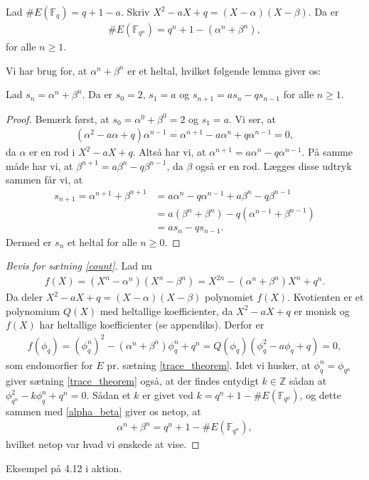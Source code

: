 \begin{theorem}
\label{count}
Lad $\#E(\mathbb{F}_q) = q + 1 - a$. Skriv $X^2 - aX + q= (X-\alpha)(X-\beta)$. Da er
\begin{align*}
	\#E(\mathbb{F}_{q^n}) = q^n + 1 - (\alpha^n + \beta^n),
\end{align*}
for alle $n \geq 1$.
\end{theorem}

Vi har brug for, at $\alpha^n + \beta^n$ er et heltal, hvilket følgende lemma giver os:

\begin{lemma}
Lad $s_n = \alpha^n + \beta^n$. Da er $s_0=2$, $s_1=a$ og $s_{n+1}=as_n - qs_{n-1}$ for alle $n \geq 1$.
\end{lemma}
\begin{proof}
Bemærk først, at $s_0 = \alpha^0 + \beta^0 = 2$ og $s_1 = a$.
Vi ser, at 
\begin{align*}
	(\alpha^2 - a\alpha + q) \alpha^{n-1} = \alpha^{n+1} - a \alpha^n + q\alpha^{n-1} = 0,
\end{align*}
da $\alpha$ er en rod i $X^2 - aX + q$. Altså har vi, at $\alpha^{n+1}=a \alpha^n - q\alpha^{n-1}$. På samme måde har vi, at $\beta^{n+1}=a \beta^n - q \beta^{n-1}$, da $\beta$ også er en rod. Lægges disse udtryk sammen får vi, at
\begin{align*}
	s_{n+1} = \alpha^{n+1} + \beta^{n+1} &= a \alpha^n - q \alpha^{n-1} + a \beta^n - q \beta^{n-1} \\
	&= a (\beta^n + \beta^n) - q (\alpha^{n-1} + \beta^{n-1}) \\
	&= a s_n - q s_{n-1}.
\end{align*}
Dermed er $s_n$ et heltal for alle $n \geq 0$.
\end{proof}

\begin{proof}[Bevis for sætning \ref{count}]
Lad nu 
\begin{align*}
	f(X) = (X^n - \alpha^n)(X^n - \beta^n) = X^{2n} - (\alpha^n + \beta^n)X^n + q^n.
\end{align*}
Da deler $X^2 - aX + q = (X- \alpha)(X-\beta)$ polynomiet $f(X)$. Kvotienten er et polynomium $Q(X)$ med heltallige koefficienter, da $X^2 - aX + q$ er monisk og $f(X)$ har heltallige koefficienter (se appendiks). Derfor er
\begin{align}
	\label{alpha_beta}
	f(\phi_q) = (\phi_{q}^{n})^2 - (\alpha^n + \beta^n) \phi_{q}^{n} + q^n
	= Q(\phi_q)(\phi_{q}^{2} - a \phi_q + q) = 0,
\end{align}
som endomorfier for $E$ pr. sætning \ref{trace_theorem}. Idet vi husker, at $\phi_{q}^{n} = \phi_{q^n}$ giver sætning \ref{trace_theorem} også, at der findes entydigt $k \in \mathbb{Z}$ sådan at $\phi_{q^n}^{2} - k \phi_{q}^{n} + q^n = 0$. Sådan et $k$ er givet ved $k=q^n + 1 - \#E(\mathbb{F}_{q^n})$, og dette sammen med \eqref{alpha_beta} giver os netop, at
\begin{align*}
	\alpha^n + \beta^n = q^n + 1 - \#E(\mathbb{F}_{q^n}),
\end{align*}
hvilket netop var hvad  vi ønskede at vise.
\end{proof}

\begin{example}
Eksempel på 4.12 i aktion.
\end{example}




